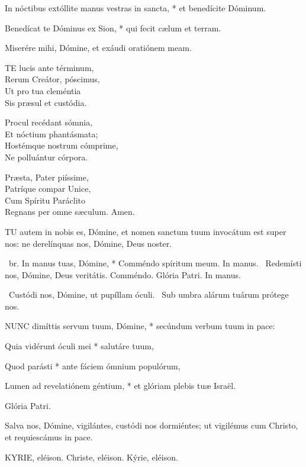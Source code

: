 In nóctibus extóllite manus vestras in sancta, * et benedícite Dóminum.

Benedícat te Dóminus ex Sion, * qui fecit cælum et terram.

 Miserére mihi, Dómine, et exáudi oratiónem meam.


\lettrine[lines=2]{T}{E} lucis ante términum,\\
Rerum Creátor, póscimus,\\
Ut pro tua cleméntia\\
Sis præsul et custódia.

Procul recédant sómnia,\\
Et nóctium phantásmata;\\
Hostémque nostrum cómprime,\\
Ne polluántur córpora.

Præsta, Pater piíssime,\\
Patríque compar Unice,\\
Cum Spíritu Paráclito\\
Regnans per omne sæculum. Amen.


\lettrine[lines=2]{T}{U} autem in nobis es, Dómine, et nomen sanctum tuum invocátum est super nos: ne derelínquas nos, Dómine, Deus noster.

\R\ br. In manus tuas, Dómine, * Comméndo spíritum meum. In manus. \V\ Redemísti nos, Dómine, Deus veritátis. Comméndo. Glória Patri. In manus.

\V\ Custódi nos, Dómine, ut pupíllam óculi. \R\ Sub umbra alárum tuárum prótege nos.


\lettrine[lines=2]{N}{UNC} dimíttis servum tuum, Dómine, * secúndum verbum tuum in pace:

Quia vidérunt óculi mei * salutáre tuum,

Quod parásti * ante fáciem ómnium populórum,

Lumen ad revelatiónem géntium, * et glóriam plebis tuæ Israël.

Glória Patri.

 Salva nos, Dómine, vigilántes, custódi nos dormiéntes; ut vigilémus cum Christo, et requiescámus in pace.


KYRIE, eléison. Christe, eléison. Kýrie, eléison.

